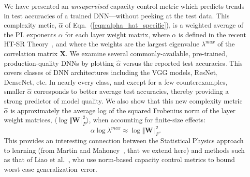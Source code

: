 {We have presented an \emph{unsupervised} capacity control metric which predicts trends in test accuracies of a trained DNN---without peeking at the test data. 
This complexity metic, $\hat{\alpha}$ of Eqn.~(\ref{eqn:alpha_hat_specific}), is a weighted average of the PL exponents $\alpha$ for each layer weight matrix, where $\alpha$ is defined in the recent HT-SR Theory~\cite{MM18_TR}, and where the weights are the largest eigenvalue $\lambda^{max}$ of the correlation matrix $\mathbf{X}$.  
%
We examine several commonly-available, pre-trained, production-quality DNNs by plotting $\hat{\alpha}$ versus the reported test accuracies.
This covers classes of DNN architectures including the VGG models, ResNet, DenseNet, etc. 
In nearly every class, and except for a few counterexamples, smaller $\hat{\alpha}$ corresponds to better average test accuracies, thereby providing a strong predictor of model quality.
%
We also show that this new complexity metric $\hat{\alpha}$ is approximately the average log of the squared Frobenius norm of the layer weight matrices, $\langle\log\Vert\mathbf{W}\Vert_{F}^{2}\rangle$, when accounting for finite-size effects:
$$
 \alpha\log\lambda^{max}\approx\log\Vert\mathbf{W}\Vert^{2}_{F}  .
$$
This provides an interesting connection between the Statistical Physics approach to learning (from Martin and Mahoney~\cite{MM17_TR,MM18_TR}, that we extend here) and methods such as that of Liao et al.~\cite{LMBx18_TR}, who use norm-based capacity control metrics to bound worst-case generalization~error.


}
